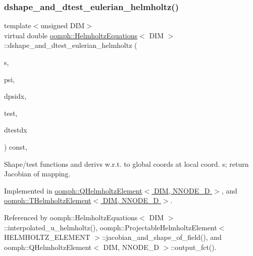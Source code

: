 \subsubsection{\texorpdfstring{dshape\+\_\+and\+\_\+dtest\+\_\+eulerian\+\_\+helmholtz()}{dshape\_and\_dtest\_eulerian\_helmholtz()}}
{\footnotesize\ttfamily template$<$unsigned D\+IM$>$ \\
virtual double \hyperlink{classoomph_1_1HelmholtzEquations}{oomph\+::\+Helmholtz\+Equations}$<$ D\+IM $>$\+::dshape\+\_\+and\+\_\+dtest\+\_\+eulerian\+\_\+helmholtz (\begin{DoxyParamCaption}\item[{const \hyperlink{classoomph_1_1Vector}{Vector}$<$ double $>$ \&}]{s,  }\item[{\hyperlink{classoomph_1_1Shape}{Shape} \&}]{psi,  }\item[{\hyperlink{classoomph_1_1DShape}{D\+Shape} \&}]{dpsidx,  }\item[{\hyperlink{classoomph_1_1Shape}{Shape} \&}]{test,  }\item[{\hyperlink{classoomph_1_1DShape}{D\+Shape} \&}]{dtestdx }\end{DoxyParamCaption}) const\hspace{0.3cm}{\ttfamily [protected]}, {}}



Shape/test functions and derivs w.\+r.\+t. to global coords at local coord. s; return Jacobian of mapping. 



Implemented in \hyperlink{classoomph_1_1QHelmholtzElement_af7fc05bfa3f872b6d82596406faf2e26}{oomph\+::\+Q\+Helmholtz\+Element$<$ D\+I\+M, N\+N\+O\+D\+E\+\_\+D $>$}, and \hyperlink{classoomph_1_1THelmholtzElement_a885ded754f152323f82c83acb5b57887}{oomph\+::\+T\+Helmholtz\+Element$<$ D\+I\+M, N\+N\+O\+D\+E\+\_\+D $>$}.



Referenced by oomph\+::\+Helmholtz\+Equations$<$ D\+I\+M $>$\+::interpolated\+\_\+u\+\_\+helmholtz(), oomph\+::\+Projectable\+Helmholtz\+Element$<$ H\+E\+L\+M\+H\+O\+L\+T\+Z\+\_\+\+E\+L\+E\+M\+E\+N\+T $>$\+::jacobian\+\_\+and\+\_\+shape\+\_\+of\+\_\+field(), and oomph\+::\+Q\+Helmholtz\+Element$<$ D\+I\+M, N\+N\+O\+D\+E\+\_\+D $>$\+::output\+\_\+fct().

\mbox{\label{classoomph_1_1HelmholtzEquations_ad9a09d4ac9e2321e7655cbe86a4d6d60}} 
